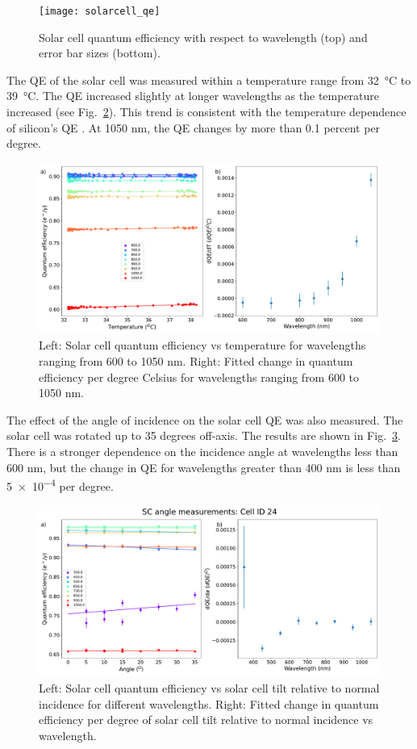\begin{figure}%
\centering
\texttt{[image: solarcell\_qe]}
\caption{Solar cell quantum efficiency with respect to wavelength (top) and error bar sizes (bottom).}
\label{fig:sc_qe}
\end{figure}

The QE of the solar cell was measured within a temperature range from \SI{32}{\degreeCelsius} to \SI{39}{\degreeCelsius}. The QE increased slightly at longer wavelengths as the temperature increased (see Fig.~\ref{fig:SC_temp}). This trend is consistent with the temperature dependence of silicon's QE \citep{Green_2008}. At 1050 nm, the QE changes by more than 0.1 percent per degree.
\begin{figure}%
\centering
\includegraphics[width=\columnwidth]{fig/SC_temp_dep.pdf}
\caption{Left: Solar cell quantum efficiency vs temperature for wavelengths ranging from 600 to 1050 nm. Right: Fitted change in quantum efficiency per degree Celsius for wavelengths ranging from 600 to 1050 nm.}
\label{fig:SC_temp}
\end{figure}

The effect of the angle of incidence on the solar cell QE was also measured. The solar cell was rotated up to 35 degrees off-axis. The results are shown in Fig.~\ref{fig:SC_angle}. There is a stronger dependence on the incidence angle at wavelengths less than 600 nm, but the change in QE for wavelengths greater than 400 nm is less than \num{5e-4}	 per degree.
\begin{figure}%
\centering
\includegraphics[width=\columnwidth]{fig/SC_angle_dep.pdf}
\caption{Left: Solar cell quantum efficiency vs solar cell tilt relative to normal incidence for different wavelengths. Right: Fitted change in quantum efficiency per degree of solar cell tilt relative to normal incidence vs wavelength.}
\label{fig:SC_angle}
\end{figure}


